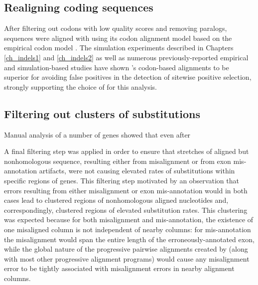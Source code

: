 \subsection{Realigning coding sequences}

After filtering out codons with low quality scores and removing
paralogs, sequences were aligned with \prank \citep{Loytynoja2008}
using its codon alignment model based on the empirical codon model
\citep{Kosiol2007}. The simulation experiments described in Chapters
\ref{ch_indels1} and \ref{ch_indels2} as well as numerous
previously-reported empirical and simulation-based studies have shown
\prank{}'s codon-based alignments to be superior for avoiding false
positives in the detection of sitewise positive selection, strongly
supporting the choice of \prank for this analysis.

\subsection{Filtering out clusters of \nsyn substitutions}

Manual analysis of a number of genes showed that even after 

A final filtering step was applied in order to ensure that stretches
of aligned but nonhomologous sequence, resulting either from
misalignment or from exon mis-annotation artifacts, were not causing
elevated rates of \nsyn substitutions within specific regions of
genes. This filtering step motivated by an observation that errors
resulting from either misalignment or exon mis-annotation would in
both cases lead to clustered regions of nonhomologous aligned
nucleotides and, correspondingly, clustered regions of elevated \nsyn
substitution rates. This clustering was expected because for both
misalignment and mis-annotation, the existence of one misaligned
column is not independent of nearby columns: for mis-annotation the
misalignment would span the entire length of the erroneously-annotated
exon, while the global nature of the progressive pairwise alignments
created by \prank{} (along with most other progressive alignment
programs) would cause any misalignment error to be tightly associated
with misalignment errors in nearby alignment columns.

